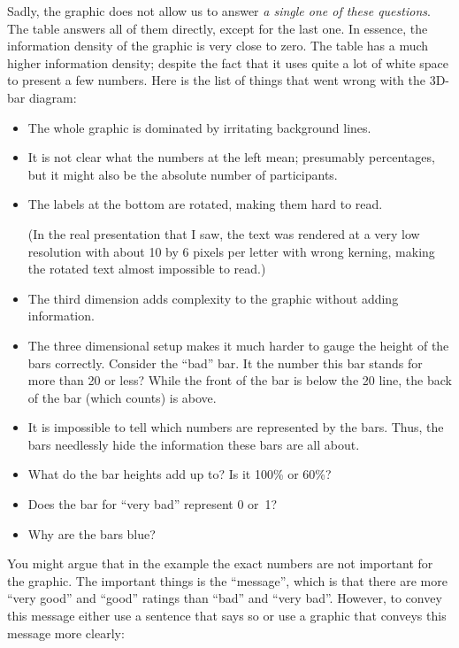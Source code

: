 Sadly, the graphic does not allow us to answer \emph{a single one of these
questions}. The table answers all of them directly, except for the last one. In
essence, the information density of the graphic is very close to zero. The
table has a much higher information density; despite the fact that it uses
quite a lot of white space to present a few numbers. Here is the list of things
that went wrong with the 3D-bar diagram:
%
\begin{itemize}
    \item The whole graphic is dominated by irritating background lines.
    \item It is not clear what the numbers at the left mean; presumably
        percentages, but it might also be the absolute number of
        participants.
    \item The labels at the bottom are rotated, making them hard to read.

        (In the real presentation that I saw, the text was rendered at a very
        low resolution with about 10 by 6 pixels per letter with wrong
        kerning, making the rotated text almost impossible to read.)
    \item The third dimension adds complexity to the graphic without adding
        information.
    \item The three dimensional setup makes it much harder to gauge the
        height of the bars correctly. Consider the ``bad'' bar. It the number
        this bar stands for more than 20 or less? While the front of the bar
        is below the 20 line, the back of the bar (which counts) is above.
    \item It is impossible to tell which  numbers are represented by the
        bars. Thus, the bars needlessly hide the information these bars are
        all about.
    \item What do the bar heights add up to? Is it 100\% or 60\%?
    \item Does the bar for ``very bad'' represent 0 or~1?
    \item Why are the bars blue?
\end{itemize}

You might argue that in the example the exact numbers are not important for the
graphic. The important things is the ``message'', which is that there are more
``very good'' and ``good'' ratings than ``bad'' and ``very bad''. However, to
convey this message either use a sentence that says so or use a graphic that
conveys this message more clearly:

